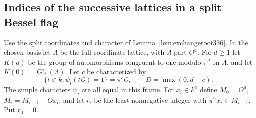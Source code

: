 \documentclass[a4paper,11pt]{article}
\theoremstyle{definition}
\theoremstyle{remark}
\numberwithin{equation}{section}
\newcommand{\GL}{\operatorname{GL}}
\begin{document}
\subsection{Indices of the successive lattices in a split Bessel flag}\label{sec:exchangeindex336}
Use the split coordinates and character of Lemma~\ref{lem:exchangeroot336}.
In the chosen basis let \(\Lambda\) be the full coordinate lattice,
with \(A\)-part \(O^a\). For \(d\ge1\) let \(K(d)\) be the group of
automorphisms congruent to one modulo \(\pi^d\) on \(\Lambda\), and
let \(K(0)=\GL(\Lambda)\). Let \(c\) be characterized by
\[
       \{t\in k:\psi_i(tO)=1\}=\pi^cO,\qquad D=\max(0,d-c).
\]
The simple characters \(\psi_i\) are all equal in this frame.
For \(x_i\in k^a\) define \(M_0=O^a\), \(M_i=M_{i-1}+Ox_i\),
and let \(r_i\) be the least nonnegative integer with
\(\pi^{r_i}x_i\in M_{i-1}\). Put \(r_0=0\).
\end{document}
